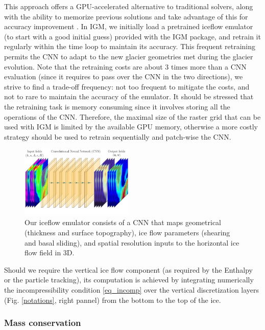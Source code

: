 \documentclass[gmd]{copernicus}
\begin{document}
This approach offers a GPU-accelerated alternative to traditional solvers, along with the ability to memorize previous solutions and take advantage of this for accuracy improvement \citep{jouvet2023ice}. In IGM, we initially load a pretrained iceflow emulator (to start with a good initial guess) provided with the IGM package, and  retrain it regularly within the time loop to maintain its accuracy. This frequent retraining permits the CNN to adapt to the new glacier geometries met during the glacier evolution. Note that the retraining costs are about 3 times more than a CNN evaluation (since it requires to pass over the CNN in the two directions), we strive to find a trade-off frequency: not too frequent to mitigate the costs, and not to rare to maintain the accuracy of the emulator. It should be stressed that the retraining task is memory consuming since it involves storing all the operations of the CNN. Therefore, the maximal size of the raster grid that can be used with IGM is limited by the available GPU memory, otherwise a more costly strategy should be used to retrain sequentially and patch-wise the CNN.

\begin{figure}[!ht]
\begin{center}
\includegraphics[width=0.48\textwidth]{fig/mapping-illu7.pdf}
\caption{\label{mapping-illu} Our iceflow emulator consists of a CNN that maps geometrical (thickness and surface topography), ice flow parameters (shearing and basal sliding), and spatial resolution inputs to the horizontal ice flow field in 3D.}
\end{center}
\end{figure}

Should we require the vertical ice flow component (as required by the Enthalpy or the particle tracking), its computation is achieved by integrating numerically the incompressibility condition \eqref{eq_incomp} over the vertical discretization layers (Fig. \ref{notations}, right pannel) from the bottom to the top of the ice.

\subsubsection{Mass conservation}
\label{num_mass_conservation}
\end{document}
